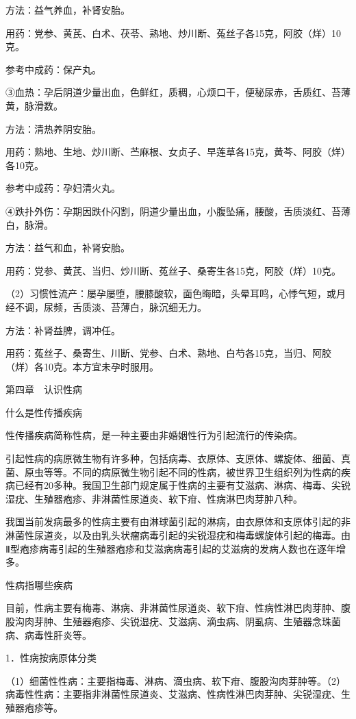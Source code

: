 \documentclass[12pt,UTF8]{ctexbook}
\begin{document}
方法：益气养血，补肾安胎。

用药：党参、黄芪、白术、茯苓、熟地、炒川断、菟丝子各15克，阿胶（烊）10克。

参考中成药：保产丸。

③血热：孕后阴道少量出血，色鲜红，质稠，心烦口干，便秘尿赤，舌质红、苔薄黄，脉滑数。

方法：清热养阴安胎。

用药：熟地、生地、炒川断、苎麻根、女贞子、早莲草各15克，黄芩、阿胶（烊）各10克。

参考中成药：孕妇清火丸。

④跌扑外伤：孕期因跌仆闪割，阴道少量出血，小腹坠痛，腰酸，舌质淡红、苔薄白，脉滑。

方法：益气和血，补肾安胎。

用药：党参、黄芪、当归、炒川断、菟丝子、桑寄生各15克，阿胶（烊）10克。

（2）习惯性流产：屡孕屡堕，腰膝酸软，面色晦暗，头晕耳鸣，心悸气短，或月经不调，尿频，舌质淡、苔薄白，脉沉细无力。

方法：补肾益脾，调冲任。

用药：菟丝子、桑寄生、川断、党参、白术、熟地、白芍各15克，当归、阿胶（烊）各10克。本方宜未孕时服用。





第四章　认识性病


什么是性传播疾病


性传播疾病简称性病，是一种主要由非婚姻性行为引起流行的传染病。

引起性病的病原微生物有许多种，包括病毒、衣原体、支原体、螺旋体、细菌、真菌、原虫等等。不同的病原微生物引起不同的性病，被世界卫生组织列为性病的疾病已经有20多种。我国卫生部门规定属于性病的主要有艾滋病、淋病、梅毒、尖锐湿疣、生殖器疱疹、非淋菌性尿道炎、软下疳、性病淋巴肉芽肿八种。

我国当前发病最多的性病主要有由淋球菌引起的淋病，由衣原体和支原体引起的非淋菌性尿道炎，以及由乳头状瘤病毒引起的尖锐湿疣和梅毒螺旋体引起的梅毒。由Ⅱ型疱疹病毒引起的生殖器疱疹和艾滋病病毒引起的艾滋病的发病人数也在逐年增多。





性病指哪些疾病


目前，性病主要有梅毒、淋病、非淋菌性尿道炎、软下疳、性病性淋巴肉芽肿、腹股沟肉芽肿、生殖器疱疹、尖锐湿疣、艾滋病、滴虫病、阴虱病、生殖器念珠菌病、病毒性肝炎等。

1．性病按病原体分类

（1）细菌性性病：主要指梅毒、淋病、滴虫病、软下疳、腹股沟肉芽肿等。（2）病毒性性病：主要指非淋菌性尿道炎、艾滋病、性病性淋巴肉芽肿、尖锐湿疣、生殖器疱疹等。
\end{document}
